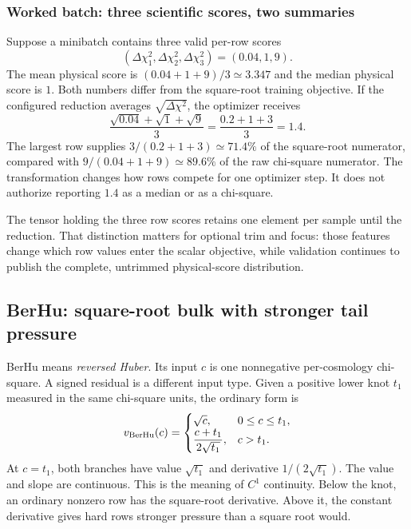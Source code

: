 \documentclass[10pt,aps,prd,twocolumn,nofootinbib]{revtex4-2}
\begin{document}
\subsubsection{Worked batch: three scientific scores, two summaries}

Suppose a minibatch contains three valid per-row scores
\begin{equation*}
  (\Delta\chi_1^2,\Delta\chi_2^2,\Delta\chi_3^2)
  =(0.04,1,9).
\end{equation*}
The mean physical score is $(0.04+1+9)/3\simeq3.347$ and the median physical
score is $1$.  Both numbers differ from the square-root training objective.  If the
configured reduction averages $\sqrt{\Delta\chi^2}$, the optimizer receives
\begin{equation*}
  \frac{\sqrt{0.04}+\sqrt{1}+\sqrt{9}}{3}
  =\frac{0.2+1+3}{3}=1.4.
\end{equation*}
The largest row supplies $3/(0.2+1+3)\simeq71.4\%$ of the square-root
numerator, compared with $9/(0.04+1+9)\simeq89.6\%$ of the raw chi-square
numerator.  The
transformation changes how rows compete for one optimizer step.  It does not
authorize reporting $1.4$ as a median or as a chi-square.

The tensor holding the three row scores retains one element per sample until
the reduction.  That distinction matters for optional trim and focus: those
features change which row values enter the scalar objective, while validation
continues to publish the complete, untrimmed physical-score distribution.

\subsection{BerHu: square-root bulk with stronger tail pressure}

BerHu means \emph{reversed Huber}.  Its input $c$ is one nonnegative
per-cosmology chi-square.  A signed residual is a different input type.  Given a positive lower knot
$t_1$ measured in the same chi-square units, the ordinary form is
\begin{equation*}
 v_{\rm BerHu}(c)=
 \begin{cases}
   \sqrt{c}, & 0\le c\le t_1,\\
   \dfrac{c+t_1}{2\sqrt{t_1}}, & c>t_1.
 \end{cases}
\end{equation*}
At $c=t_1$, both branches have value $\sqrt{t_1}$ and derivative
$1/(2\sqrt{t_1})$.  The value and slope are continuous.  This is the meaning
of $C^1$ continuity.  Below the knot, an ordinary nonzero row has the
square-root derivative.  Above it, the constant derivative gives hard rows
stronger pressure than a square root would.
\end{document}
